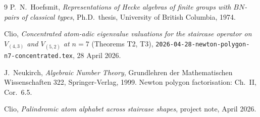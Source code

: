 \documentclass[11pt]{article}
\theoremstyle{plain}
\theoremstyle{definition}
\theoremstyle{remark}
\begin{document}
\begin{thebibliography}{9}
 P.~N.~Hoefsmit, \emph{Representations of Hecke algebras of
finite groups with $BN$-pairs of classical types}, Ph.D.\ thesis, University of
British Columbia, 1974.

 Clio, \emph{Concentrated atom-adic eigenvalue valuations
for the staircase operator on $V_{(4,3)}$ and $V_{(5,2)}$ at $n = 7$}
(Theorems T2, T3),
\texttt{2026-04-28-newton-polygon-n7-concentrated.tex}, 28 April 2026.

 J.~Neukirch, \emph{Algebraic Number Theory}, Grundlehren der
Mathematischen Wissenschaften 322, Springer-Verlag, 1999.  Newton polygon
factorisation: Ch.~II, Cor.~6.5.

 Clio, \emph{Palindromic atom alphabet across staircase
shapes}, project note, April 2026.
\end{thebibliography}
\end{document}
